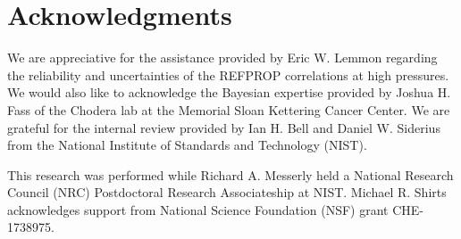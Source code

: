 \documentclass[preprint,letterpaper,floatfix,citeautoscript,aip,jcp]{revtex4-1}
\begin{document}
\section*{Acknowledgments}

We are appreciative for the assistance provided by Eric W. Lemmon regarding the reliability and uncertainties of the REFPROP correlations at high pressures. We would also like to acknowledge the Bayesian expertise provided by Joshua H. Fass of the Chodera lab at the Memorial Sloan Kettering Cancer Center. We are grateful for the internal review provided by Ian H. Bell and Daniel W. Siderius from the National Institute of Standards and Technology (NIST). 

This research was performed while Richard A. Messerly held a National Research Council (NRC) Postdoctoral Research Associateship at NIST. Michael R. Shirts acknowledges support from National Science Foundation (NSF) grant CHE-1738975.


\end{document}
